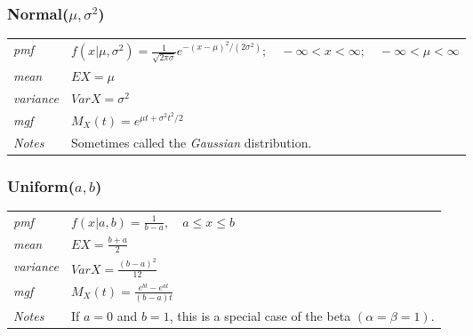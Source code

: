 \documentclass[12pt]{article}
\begin{document}
\subsubsection*{Normal($\mu, \sigma^2$)\cite[p. 625]{StatisticalInference}}
\begin{tabularx}{\textwidth}{ l X }
\emph{pmf} & $f(x|\mu, \sigma^2)=\frac{1}{\sqrt{2\pi \sigma}}e^{-(x-\mu)^2/(2\sigma^2)}; \quad -\infty < x < \infty; \quad -\infty < \mu < \infty$ \\
\emph{mean} & $EX = \mu$ \\
\emph{variance} & $Var X = \sigma^2$ \\
\emph{mgf} & $M_X(t)= e^{\mu t + \sigma^2t^2/2}$ \\
\emph{Notes} & Sometimes called the \emph{Gaussian} distribution.\\
\end{tabularx}

\subsubsection*{Uniform($a, b$)\cite[p. 626]{StatisticalInference}}
\begin{tabularx}{\textwidth}{ l X }
\emph{pmf} & $f(x|a, b)=\frac{1}{b-a}, \quad a \leq x \leq b$ \\
\emph{mean} & $EX = \frac{b+a}{2}$ \\
\emph{variance} & $Var X = \frac{(b-a)^2}{12}$ \\
\emph{mgf} & $M_X(t)=\frac{e^{bt}-e^{at}}{(b-a)t}$ \\
\emph{Notes} & If $a=0$ and $b=1$, this is a special case of the beta $(\alpha = \beta = 1)$.\\
\end{tabularx}



\newpage


\end{document}
